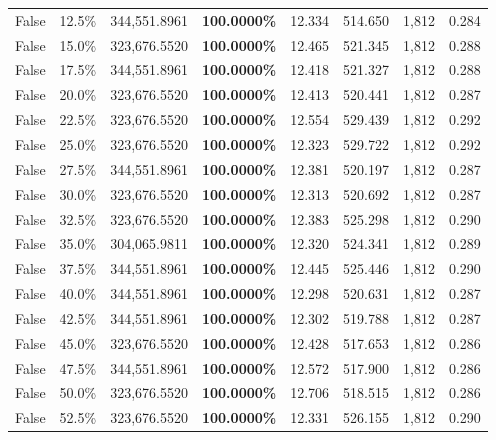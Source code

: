 \begin{table}[H]
\begin{tabular}{lllrllll}
\cline{1-8}
False & 12.5\% & 344,551.8961 & \bfseries \color{red} 100.0000\% & 12.334 & 514.650 & 1,812 & 0.284 \\
\cline{1-8}
False & 15.0\% & 323,676.5520 & \bfseries \color{red} 100.0000\% & 12.465 & 521.345 & 1,812 & 0.288 \\
\cline{1-8}
False & 17.5\% & 344,551.8961 & \bfseries \color{red} 100.0000\% & 12.418 & 521.327 & 1,812 & 0.288 \\
\cline{1-8}
False & 20.0\% & 323,676.5520 & \bfseries \color{red} 100.0000\% & 12.413 & 520.441 & 1,812 & 0.287 \\
\cline{1-8}
False & 22.5\% & 323,676.5520 & \bfseries \color{red} 100.0000\% & 12.554 & 529.439 & 1,812 & 0.292 \\
\cline{1-8}
False & 25.0\% & 323,676.5520 & \bfseries \color{red} 100.0000\% & 12.323 & 529.722 & 1,812 & 0.292 \\
\cline{1-8}
False & 27.5\% & 344,551.8961 & \bfseries \color{red} 100.0000\% & 12.381 & 520.197 & 1,812 & 0.287 \\
\cline{1-8}
False & 30.0\% & 323,676.5520 & \bfseries \color{red} 100.0000\% & 12.313 & 520.692 & 1,812 & 0.287 \\
\cline{1-8}
False & 32.5\% & 323,676.5520 & \bfseries \color{red} 100.0000\% & 12.383 & 525.298 & 1,812 & 0.290 \\
\cline{1-8}
False & 35.0\% & \color{red} 304,065.9811 & \bfseries \color{red} 100.0000\% & 12.320 & 524.341 & 1,812 & 0.289 \\
\cline{1-8}
False & 37.5\% & 344,551.8961 & \bfseries \color{red} 100.0000\% & 12.445 & 525.446 & 1,812 & 0.290 \\
\cline{1-8}
False & 40.0\% & 344,551.8961 & \bfseries \color{red} 100.0000\% & 12.298 & 520.631 & 1,812 & 0.287 \\
\cline{1-8}
False & 42.5\% & 344,551.8961 & \bfseries \color{red} 100.0000\% & 12.302 & 519.788 & 1,812 & 0.287 \\
\cline{1-8}
False & 45.0\% & 323,676.5520 & \bfseries \color{red} 100.0000\% & 12.428 & 517.653 & 1,812 & 0.286 \\
\cline{1-8}
False & 47.5\% & 344,551.8961 & \bfseries \color{red} 100.0000\% & 12.572 & 517.900 & 1,812 & 0.286 \\
\cline{1-8}
False & 50.0\% & 323,676.5520 & \bfseries \color{red} 100.0000\% & 12.706 & 518.515 & 1,812 & 0.286 \\
\cline{1-8}
False & 52.5\% & 323,676.5520 & \bfseries \color{red} 100.0000\% & 12.331 & 526.155 & 1,812 & 0.290 \\

\end{tabular}
\end{table}
